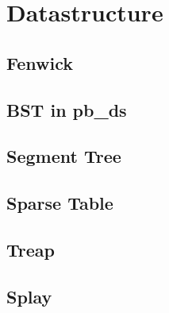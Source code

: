 \section{Datastructure}
\subsection{Fenwick}



\subsection{BST in pb\_ds}


\subsection{Segment Tree}



\subsection{Sparse Table}


\subsection{Treap}


\subsection{Splay}


